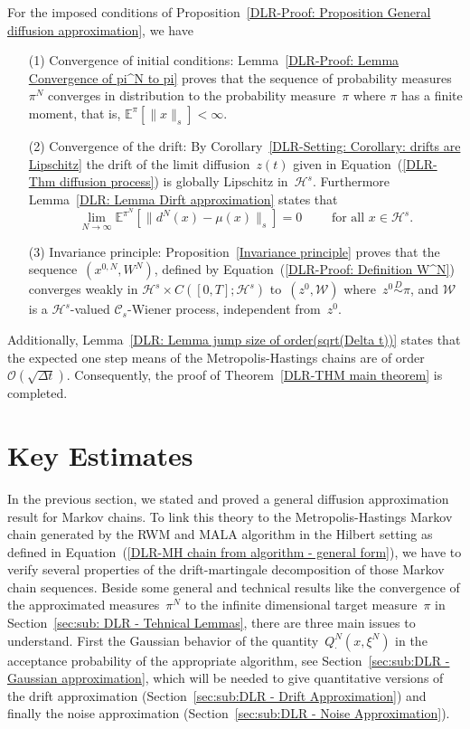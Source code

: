 For the imposed conditions of Proposition~\ref{DLR-Proof: Proposition General diffusion approximation}, we have
 \begin{enumerate}
    \item[(1)] Convergence of initial conditions: Lemma~\ref{DLR-Proof: Lemma Convergence of pi^N to pi} proves that the sequence of probability measures~$\pi^N$ converges in distribution to the probability measure~$\pi$ where $\pi$ has a finite moment, that is, $\mathbb{E}^{\pi}[\|x\|_s]<\infty$. 
    \item[(2)] Convergence of the drift: By Corollary~\ref{DLR-Setting: Corollary: drifts are Lipschitz} the drift of the limit diffusion~$z(t)$ given in Equation~(\ref{DLR-Thm diffusion process}) is globally Lipschitz in~$\mathcal{H}^s$. Furthermore Lemma~\ref{DLR: Lemma Dirft approximation} states that 
    \begin{equation*}
      \lim_{N \to \infty} \mathbb{E}^{\pi^N}[ \|  d^N(x) - \mu(x) \|_{s} ] = 0 \qquad \text{ for all } x \in \mathcal{H}^s.
    \end{equation*}
    \item[(3)] Invariance principle: Proposition~\ref{Invariance principle} proves that the sequence~$(x^{0,N}, W^N)$, defined by Equation~(\ref{DLR-Proof: Definition W^N}) converges weakly in $\mathcal{H}^s \times C([0,T]; \mathcal{H}^s)$ to~$(z^0, \mathcal{W})$ where~$z^0 \stackrel{D}{\sim} \pi$, and $\mathcal{W}$ is a $\mathcal{H}^s$-valued $\mathcal{C}_s$-Wiener process, independent from~$z^0$.
  \end{enumerate}
Additionally, Lemma~\ref{DLR: Lemma jump size of order(sqrt(Delta t))} states that the expected one step means of the Metropolis-Hastings chains are of order~$\mathcal{O}(\sqrt{\Delta t})$. Consequently, the proof of Theorem~\ref{DLR-THM main theorem} is completed.



\section{Key Estimates}
\label{sec:DLR-Estimates}

In the previous section, we stated and proved a general diffusion approximation result for Markov chains. To link this theory to the Metropolis-Hastings Markov chain generated by the RWM and MALA algorithm in the Hilbert setting as defined in Equation~(\ref{DLR-MH chain from algorithm - general form}), we have to verify several properties of the drift-martingale decomposition of those Markov chain sequences. Beside some general and technical results like the convergence of the approximated measures~$\pi^N$ to the infinite dimensional target measure~$\pi$ in Section~\ref{sec:sub: DLR - Tehnical Lemmas}, there are three main issues to understand. First the Gaussian behavior of the quantity~$Q^{N}_{\cdot}(x, \xi^N)$ in the acceptance probability of the appropriate algorithm, see Section~\ref{sec:sub:DLR - Gaussian approximation}, which will be needed to give quantitative versions of the drift approximation (Section~\ref{sec:sub:DLR - Drift Approximation}) and finally the noise approximation (Section~\ref{sec:sub:DLR - Noise Approximation}).

